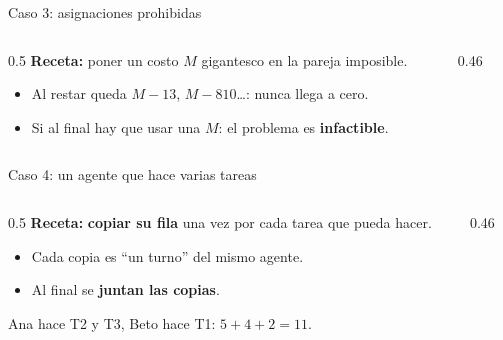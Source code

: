 \documentclass[aspectratio=169]{beamer}
\newcommand{\rejilla}[3]{%
  \foreach \i in {2,...,#2}{\foreach \j in {2,...,#3}{%
    \draw[gray!55, thin] (#1-\i-\j.north west) rectangle (#1-\i-\j.south east);}}%
  \draw[thick] (#1-2-2.north west) rectangle (#1-#2-#3.south east);}
\newcommand{\cero}[2]{\node[asignado] at (#1-#2) {};}
\newcommand{\pie}[4]{\node[font=\scriptsize\itshape, below=1mm, align=center] at ($(#1-#2-2.south west)!0.5!(#1-#2-#3.south east)$) {#4};}
\begin{document}
\begin{frame}{Caso 3: asignaciones prohibidas}
  \begin{columns}[c]
    \begin{column}{0.5\textwidth}
      \textbf{Receta:} poner un costo \textbf{$M$} gigantesco en la pareja imposible.
      \begin{itemize}
        \item Al restar queda $M - 13$, $M - 810$\dots: nunca llega a cero.
        \item Si al final hay que usar una $M$: el problema es \textbf{infactible}.
      \end{itemize}
    \end{column}
    \begin{column}{0.46\textwidth}
      \centering
    \end{column}
  \end{columns}
\end{frame}

\begin{frame}{Caso 4: un agente que hace varias tareas}
  \begin{columns}[c]
    \begin{column}{0.5\textwidth}
      \textbf{Receta:} \textbf{copiar su fila} una vez por cada tarea que pueda hacer.
      \begin{itemize}
        \item Cada copia es ``un turno'' del mismo agente.
        \item Al final se \textbf{juntan las copias}.
      \end{itemize}
      {\small Ana hace T2 y T3, Beto hace T1: $5 + 4 + 2 = 11$.}
    \end{column}
    \begin{column}{0.46\textwidth}
      \centering
    \end{column}
  \end{columns}
\end{frame}
\end{document}
